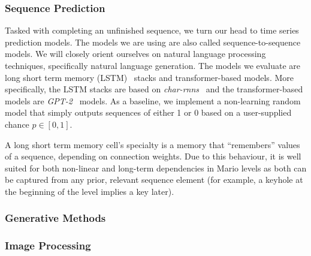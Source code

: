 \subsubsection{Sequence Prediction}

Tasked with completing an unfinished sequence, we turn our head to
time series prediction models. The models we are using are also called
sequence-to-sequence models. We will closely orient ourselves on
natural language processing techniques, specifically natural language
generation. The models we evaluate are long short term memory (LSTM)~\cite{}
stacks and transformer-based models. More specifically, the LSTM
stacks are based on \emph{char-rnns}~\cite{andrejKarpathyCharrnn2019}
and the transformer-based models are
\emph{GPT-2}~\cite{radfordLanguageModelsAre,OpenaiGpt22019} models. As
a baseline, we implement a non-learning random model that simply
outputs sequences of either 1 or 0 based on a user-supplied chance
$p \in [0, 1]$.

A long short term memory cell's specialty is a memory that
``remembers'' values of a sequence, depending on connection weights.
Due to this behaviour, it is well suited for both non-linear and
long-term dependencies in Mario levels as both can be captured from
any prior, relevant sequence element (for example, a keyhole at the
beginning of the level implies a key later).



\subsubsection{Generative Methods}



\subsubsection{Image Processing}




